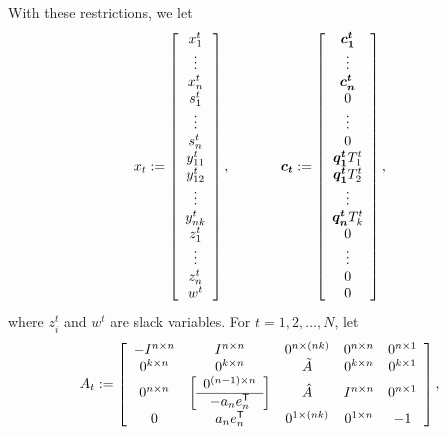 With these restrictions, we let
\begin{equation*}
x_t := \left[
\begin{array}{c}
	x_1^t\\
	\vdots\\
	x_n^t\\
	s_1^t\\
	\vdots\\
	s_n^t\\
	y_{11}^t\\
	y_{12}^t\\
	\vdots\\
	y_{nk}^t\\
	z_1^t\\
	\vdots\\
	z_n^t\\
	w^t
\end{array}
\right], \hspace{0.5in}
\mathbf{\boldsymbol{c_t}} := \left[
\begin{array}{c}
	\mathbf{\boldsymbol{c_1^t}}\\
	\vdots\\
	\mathbf{\boldsymbol{c_n^t}}\\
	0\\
	\vdots\\
	0\\
	\mathbf{\boldsymbol{q_{1}^t}} T_1^t\\
	\mathbf{\boldsymbol{q_{1}^t}} T_2^t\\
	\vdots\\
	\mathbf{\boldsymbol{q_{n}^t}} T_k^t\\
	0\\
	\vdots\\
	0\\
	0
\end{array}
\right],
\end{equation*}
where $z_i^t$ and $w^t$ are slack variables.  For $t=1, 2, \ldots, N$, let
\begin{equation*}
A_t := \left[
\begin{array}{ccccc}
-I^{n \times n}	&	I^{n\times n}	&	0^{n\times (nk)}	& 0^{n\times n} & 0^{n\times 1}\\
0^{k\times n}	&	0^{k\times n}	&	\tilde{A}	&	0^{k\times n}	& 0^{k\times 1}\\
0^{n\times n}	& \left[
	\begin{array}{c}
		0^{(n-1)\times n}\\ \hline
		-a_n e_n^{\mbox{\scriptsize\sf T}}
	\end{array}	\right]				&	\hat{A}		&	I^{n\times n}	& 0^{n\times 1}\\
0		&	a_n e_n^{\mbox{\scriptsize\sf T}}		&	0^{1\times (nk)}	& 0^{1\times n} & -1
\end{array}
\right],
\end{equation*}
